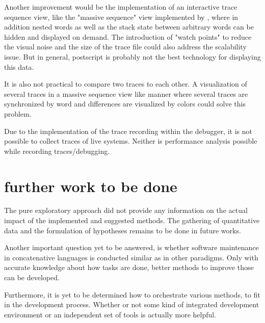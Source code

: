 Another improvement would be the implementation of an interactive trace sequence view, like the "massive sequence" view implemented by \cite{Cornelissen:2008:ETA:1454787.1454981}, where in addition nested words as well as the stack state between arbitrary words can be hidden and displayed on demand. The introduction of "watch points" to reduce the visual noise and the size of the trace file could also address the scalability issue. But in general, postscript is probably not the best technology for displaying this data.

It is also not practical to compare two traces to each other. A visualization of several traces in a massive sequence view like manner where several traces are synchronized by word and differences are visualized by colors could solve this problem.

Due to the implementation of the trace recording within the debugger, it is not possible to collect traces of live systems. Neither is performance analysis possible while recording traces/debugging.
 

\section{further work to be done}

The pure exploratory approach did not provide any information on the actual impact of the implemented and suggested methods. The gathering of quantitative data and the formulation of hypotheses remains to be done in future works.

Another important question yet to be answered, is whether software maintenance in concatenative languages is conducted similar as in other paradigms. Only with accurate knowledge about how tasks are done, better methods to improve those can be developed.

Furthermore, it is yet to be determined how to orchestrate various methods, to fit in the development process. Whether or not some kind of integrated development environment or an independent set of tools is actually more helpful.

